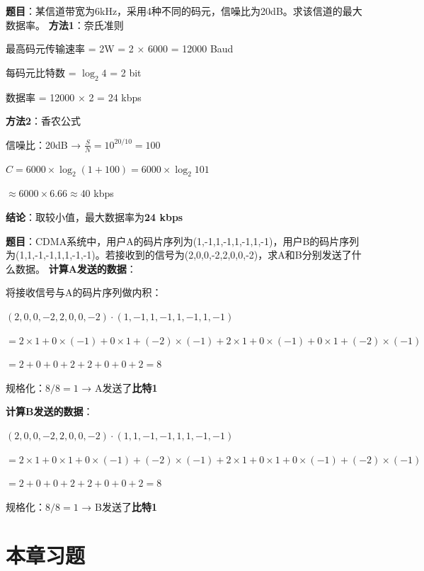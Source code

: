 \begin{examplebox}[例题2.6 信道容量综合]
\textbf{题目}：某信道带宽为6kHz，采用4种不同的码元，信噪比为20dB。求该信道的最大数据率。
\tcblower
\textbf{方法1}：奈氏准则

最高码元传输速率 = 2W = 2 × 6000 = 12000 Baud

每码元比特数 = $\log_2 4$ = 2 bit

数据率 = 12000 × 2 = 24 kbps

\textbf{方法2}：香农公式

信噪比：20dB → $\frac{S}{N} = 10^{20/10} = 100$

$C = 6000 \times \log_2(1+100) = 6000 \times \log_2 101$

$\approx 6000 \times 6.66 \approx 40$ kbps

\textbf{结论}：取较小值，最大数据率为\textbf{24 kbps}
\end{examplebox}

\begin{examplebox}[例题2.7 CDMA码片序列]
\textbf{题目}：CDMA系统中，用户A的码片序列为(1,-1,1,-1,1,-1,1,-1)，用户B的码片序列为(1,1,-1,-1,1,1,-1,-1)。若接收到的信号为(2,0,0,-2,2,0,0,-2)，求A和B分别发送了什么数据。
\tcblower
\textbf{计算A发送的数据}：

将接收信号与A的码片序列做内积：

$(2,0,0,-2,2,0,0,-2) \cdot (1,-1,1,-1,1,-1,1,-1)$

$= 2×1 + 0×(-1) + 0×1 + (-2)×(-1) + 2×1 + 0×(-1) + 0×1 + (-2)×(-1)$

$= 2 + 0 + 0 + 2 + 2 + 0 + 0 + 2 = 8$

规格化：$8/8 = 1$ → A发送了\textbf{比特1}

\textbf{计算B发送的数据}：

$(2,0,0,-2,2,0,0,-2) \cdot (1,1,-1,-1,1,1,-1,-1)$

$= 2×1 + 0×1 + 0×(-1) + (-2)×(-1) + 2×1 + 0×1 + 0×(-1) + (-2)×(-1)$

$= 2 + 0 + 0 + 2 + 2 + 0 + 0 + 2 = 8$

规格化：$8/8 = 1$ → B发送了\textbf{比特1}
\end{examplebox}

\section{本章习题}

